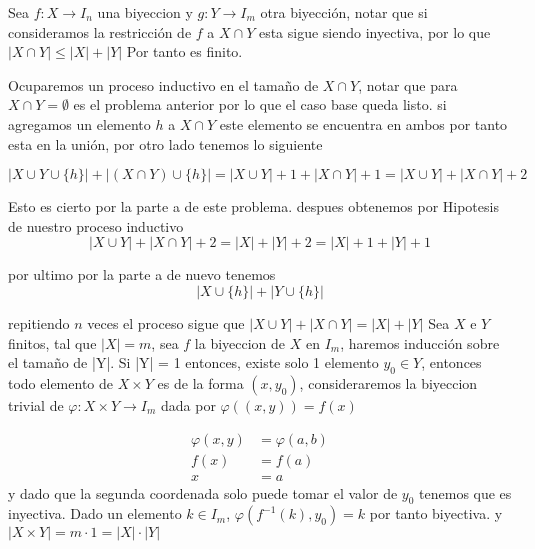 \documentclass{homework}
\begin{document}
\parte
Sea \(f: X \to I_n\) una biyeccion y \(g: Y \to I_m\) otra biyección, notar que si consideramos
la restricción de \(f\) a \(X \cap Y\) esta sigue siendo inyectiva, por lo que \(|X \cap Y| \leq |X| + |Y|\)
Por tanto es finito.

Ocuparemos un proceso inductivo en el tamaño de \(X \cap Y\), notar que para \(X \cap Y = \emptyset\) es el problema anterior por lo que el caso base queda listo. si agregamos un elemento \(h\) a \(X \cap Y\) este
elemento se encuentra en ambos por tanto esta en la unión, por otro lado tenemos lo siguiente

\begin{equation*}
    |X \cup Y \cup \{h\}| + |(X \cap Y) \cup \{h\}| = |X \cup Y| + 1 + |X \cap Y| + 1 = |X \cup Y| + |X \cap Y| + 2
\end{equation*}

Esto es cierto por la parte a de este problema. despues obtenemos por Hipotesis de nuestro proceso inductivo
\begin{equation*}
    |X \cup Y| + |X \cap Y| + 2 = |X| + |Y| + 2 = |X| + 1 + |Y| + 1
\end{equation*}

por ultimo por la parte a de nuevo tenemos
\begin{equation*}
    |X \cup \{h\}| + |Y \cup \{h\}|
\end{equation*}

repitiendo \(n\) veces el proceso sigue que \(|X \cup Y| + |X \cap Y| = |X| + |Y|\)
\parte
Sea \(X\) e \(Y\) finitos, tal que \(|X| = m\), sea \(f\) la biyeccion de \(X\) en \(I_m\), haremos inducción sobre el tamaño de |Y|.
Si |Y| = 1 entonces, existe solo 1 elemento \(y_0 \in Y\), entonces todo elemento de \(X \times Y\) es de la
forma \((x, y_0)\), consideraremos la biyeccion trivial de \(\varphi : X \times Y \to I_m\) dada por \(\varphi((x, y)) = f(x)\)

\begin{align*}
    \varphi(x, y) &= \varphi(a, b)\\
    f(x) &= f(a)\\
    x &= a
\end{align*}
y dado que la segunda coordenada solo puede tomar el valor de \(y_0\) tenemos que es inyectiva. Dado un elemento \(k \in I_m\), \(\varphi(f^{-1}(k), y_0) = k\)
por tanto biyectiva. y \(|X \times Y| = m \cdot 1 = |X| \cdot |Y|\)
\end{document}
